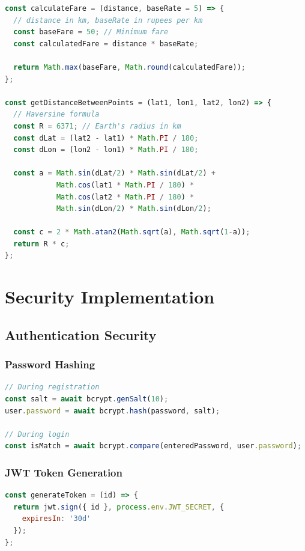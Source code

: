 \documentclass[12pt,a4paper]{article}
\begin{document}
\begin{lstlisting}[language=JavaScript, caption=Distance-Based Fare Calculation]
const calculateFare = (distance, baseRate = 5) => {
  // distance in km, baseRate in rupees per km
  const baseFare = 50; // Minimum fare
  const calculatedFare = distance * baseRate;
  
  return Math.max(baseFare, Math.round(calculatedFare));
};

const getDistanceBetweenPoints = (lat1, lon1, lat2, lon2) => {
  // Haversine formula
  const R = 6371; // Earth's radius in km
  const dLat = (lat2 - lat1) * Math.PI / 180;
  const dLon = (lon2 - lon1) * Math.PI / 180;
  
  const a = Math.sin(dLat/2) * Math.sin(dLat/2) +
            Math.cos(lat1 * Math.PI / 180) * 
            Math.cos(lat2 * Math.PI / 180) *
            Math.sin(dLon/2) * Math.sin(dLon/2);
  
  const c = 2 * Math.atan2(Math.sqrt(a), Math.sqrt(1-a));
  return R * c;
};
\end{lstlisting}

\newpage

\section{Security Implementation}

\subsection{Authentication Security}

\subsubsection{Password Hashing}
\begin{lstlisting}[language=JavaScript, caption=bcrypt Implementation]
// During registration
const salt = await bcrypt.genSalt(10);
user.password = await bcrypt.hash(password, salt);

// During login
const isMatch = await bcrypt.compare(enteredPassword, user.password);
\end{lstlisting}

\subsubsection{JWT Token Generation}
\begin{lstlisting}[language=JavaScript, caption=Token Creation]
const generateToken = (id) => {
  return jwt.sign({ id }, process.env.JWT_SECRET, {
    expiresIn: '30d'
  });
};
\end{lstlisting}
\end{document}
